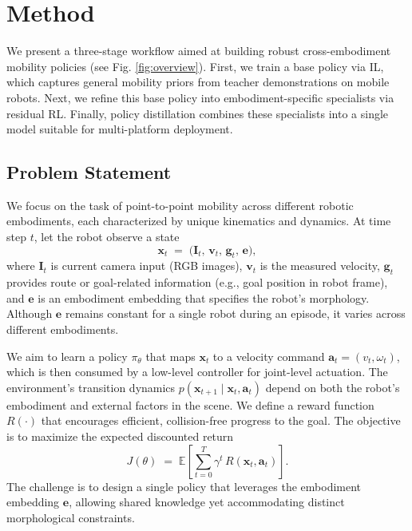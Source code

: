 \documentclass[letterpaper, 10 pt,conference]{ieeeconf}
\begin{document}
\section{Method}
\label{sec:approach}
We present a three-stage workflow aimed at building robust cross-embodiment mobility policies (see Fig. \ref{fig:overview}). First, we train a base policy via IL, which captures general mobility priors from teacher demonstrations on mobile robots. Next, we refine this base policy into embodiment-specific specialists via residual RL. Finally, policy distillation combines these specialists into a single model suitable for multi-platform deployment.

\subsection{Problem Statement}
\label{sec:problem}

We focus on the task of point-to-point mobility across different robotic embodiments, each characterized by unique kinematics and dynamics. At time step $t$, let the robot observe a state
\[
    \mathbf{x}_t \;=\; \bigl(\mathbf{I}_t,\, \mathbf{v}_t,\, \mathbf{g}_t,\, \mathbf{e}\bigr),
\]
where $\mathbf{I}_t$ is current camera input (RGB images), $\mathbf{v}_t$ is the measured velocity, $\mathbf{g}_t$ provides route or goal-related information (e.g., goal position in robot frame), and $\mathbf{e}$ is an embodiment embedding that specifies the robot’s morphology. Although $\mathbf{e}$ remains constant for a single robot during an episode, it varies across different embodiments.

We aim to learn a policy $\pi_\theta$ that maps $\mathbf{x}_t$ to a velocity command $\mathbf{a}_t = (v_t, \omega_t)$, which is then consumed by a low-level controller for joint-level actuation. The environment’s transition dynamics $p(\mathbf{x}_{t+1}\mid\mathbf{x}_t,\mathbf{a}_t)$ depend on both the robot’s embodiment and external factors in the scene. We define a reward function $R(\cdot)$ that encourages efficient, collision-free progress to the goal. The objective is to maximize the expected discounted return
\[
    J(\theta) \;=\; \mathbb{E}\left[\sum_{t=0}^{T} \gamma^t\, R(\mathbf{x}_t, \mathbf{a}_t)\right].
\]
The challenge is to design a single policy that leverages the embodiment embedding $\mathbf{e}$, allowing shared knowledge yet accommodating distinct morphological constraints.
\end{document}
